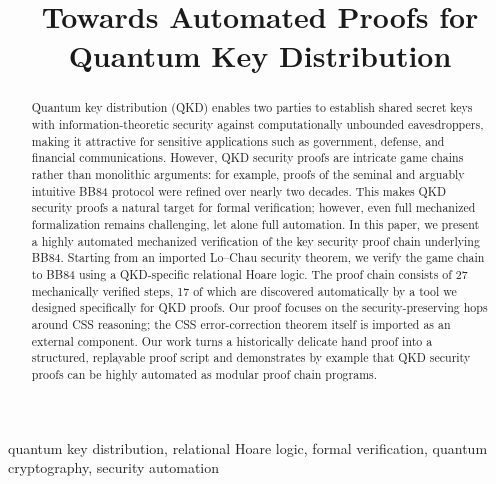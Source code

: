 \documentclass[conference,compsoc]{IEEEtran}
\newcommand{\bb}{\textsf{BB84}\xspace}
\begin{document}
\flushbottom
\setlength{\emergencystretch}{1.5em}
\setlength{\textfloatsep}{6pt plus 2pt minus 2pt}
\setlength{\floatsep}{6pt plus 2pt minus 2pt}
\setlength{\intextsep}{6pt plus 2pt minus 2pt}
\setlength{\abovedisplayskip}{5pt plus 2pt minus 2pt}
\setlength{\belowdisplayskip}{5pt plus 2pt minus 2pt}
\setlength{\abovedisplayshortskip}{3pt plus 1pt minus 1pt}
\setlength{\belowdisplayshortskip}{3pt plus 1pt minus 1pt}
\setlength{\jot}{2pt}
\hfuzz=50pt

\title{Towards Automated Proofs for Quantum Key Distribution}


\author{}

\maketitle

\begin{abstract}

Quantum key distribution (QKD) enables two parties to establish shared secret keys with information-theoretic security against computationally unbounded eavesdroppers, making it attractive for sensitive applications such as government, defense, and financial communications. However, QKD security proofs are intricate game chains rather than monolithic arguments: for example, proofs of the seminal and arguably intuitive \bb protocol were refined over nearly two decades. This makes QKD security proofs a natural target for formal verification; however, even full mechanized formalization remains challenging, let alone full automation. In this paper, we present a highly automated mechanized verification of the key security proof chain underlying \bb. Starting from an imported Lo--Chau security theorem, we verify the game chain to \bb using a QKD-specific relational Hoare logic. The proof chain consists of 27 mechanically verified steps, 17 of which are discovered automatically by a tool we designed specifically for QKD proofs. Our proof focuses on the security-preserving hops around CSS reasoning; the CSS error-correction theorem itself is imported as an external component. Our work turns a historically delicate hand proof into a structured, replayable proof script and demonstrates by example that QKD security proofs can be highly automated as modular proof chain programs.
\end{abstract}

\begin{IEEEkeywords}
quantum key distribution, relational Hoare logic, formal verification, quantum cryptography, security automation
\end{IEEEkeywords}
\end{document}
